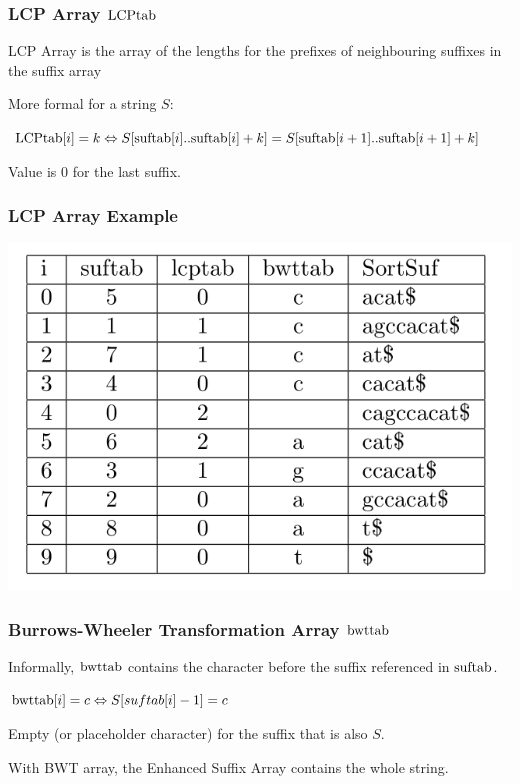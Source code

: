\documentclass[compress,handout]{beamer} %
\begin{document}
\begin{frame}
	\frametitle{LCP Array $\hbox{LCPtab}$}
	LCP Array is the array of the lengths for the prefixes of
	neighbouring suffixes in the suffix array

	More formal for a string $S$:

	$\hbox{LCPtab}[i]=k \Leftrightarrow S[\hbox{suftab}[i]..\hbox{suftab}[i]+k]=S[\hbox{suftab}[i+1]..\hbox{suftab}[i+1]+k]$

	Value is $0$ for the last suffix.
\end{frame}

\begin{frame}
	\frametitle{LCP Array Example}
	\includegraphics[width=\textwidth, height=\textheight, keepaspectratio=true]{esa_lcp_search}
\end{frame}

\begin{frame}
	\frametitle{Burrows-Wheeler Transformation Array $\hbox{bwttab}$}
	Informally, $\hbox{bwttab}$ contains the character before the
	suffix referenced in $\hbox{suftab}$.

	$\hbox{bwttab}[i]=c \Leftrightarrow S[suftab[i]-1]=c$

	Empty (or placeholder character) for the suffix that is also $S$.

	With BWT array, the Enhanced Suffix Array contains the whole
	string.
\end{frame}
\end{document}
